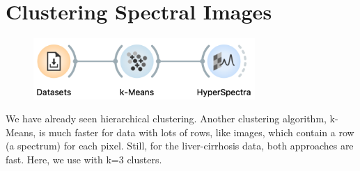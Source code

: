 \chapter{Clustering Spectral Images}
\label{ch:spectra_image_clustering}

\begin{figure}
    \centering
    \vspace{-3.3cm}
    \includegraphics[width=0.75\textwidth]{graphics/ch-spectra_image_clustering/sp_image_clustering-fig1.png}
    \label{fig:spectra_image_clustering-fig1}
\end{figure}

We have already seen hierarchical clustering. Another clustering algorithm, k-Means, is much faster for data with lots of rows, like images, which contain a row (a spectrum) for each pixel. Still, for the liver-cirrhosis data, both approaches are fast. Here, we use  with k=3 clusters. 

